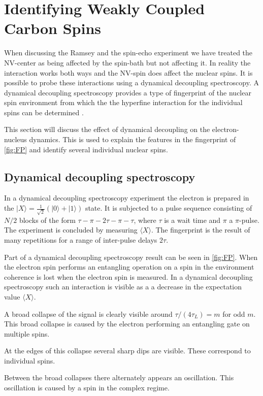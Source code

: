 \section{Identifying Weakly Coupled Carbon Spins}
When discussing the Ramsey and the spin-echo experiment we have treated the NV-center as being affected by the spin-bath but not affecting it.
In reality the interaction works both ways and the NV-spin does affect the nuclear spins.
It is possible to probe these interactions using a dynamical decoupling spectroscopy.
A dynamical decoupling spectroscopy provides a type of fingerprint of the nuclear spin environment from which the the hyperfine interaction for the individual spins can be determined \citep{Taminiau2012Detection,Taminiau2014Universal}.

This section will discuss the effect of dynamical decoupling on the electron-nucleus dynamics.
This is used to explain the features in the fingerprint of \cref{fig:FP} and identify several individual nuclear spins.


\subsection{Dynamical decoupling spectroscopy}

In a dynamical decoupling spectroscopy experiment the electron is prepared in the $|X\rangle =\tfrac{1}{\sqrt{2}}\left( |0\rangle +|1\rangle \right) $ state.
It is subjected to a pulse sequence consisting of $N/2$ blocks of the form {$\tau - \pi -2\tau-\pi-\tau$}, where $\tau$ is a wait time and $\pi$ a $\pi$-pulse.
The experiment is concluded by measuring $\langle X\rangle $.
The fingerprint is the result of many repetitions for a range of inter-pulse delays $2\tau$.

Part of a dynamical decoupling spectroscopy result can be seen in \cref{fig:FP}.
When the electron spin performs an entangling operation on a spin in the environment coherence is lost when the electron spin is measured.
In a dynamical decoupling spectroscopy such an interaction is visible as a a decrease in the expectation value $\langle X\rangle$.

A broad collapse of the signal is clearly visible around $\tau/(4\tau_L) = m$ for odd $m$.
This broad collapse is caused by the electron performing an entangling gate on multiple spins.

At the edges of this collapse several sharp dips are visible.
These correspond to individual spins.

Between the broad collapses there alternately appears an oscillation.
This oscillation is caused by a spin in the complex regime.

